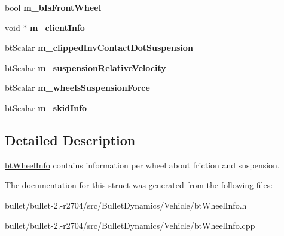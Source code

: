 \begin{DoxyCompactItemize}
\item 
\hypertarget{structbt_wheel_info_a9b3fb7a137ef5b63ccca224934575719}{bool {\bfseries m\+\_\+b\+Is\+Front\+Wheel}}\label{structbt_wheel_info_a9b3fb7a137ef5b63ccca224934575719}

\item 
\hypertarget{structbt_wheel_info_a9f7e8c78591d32cf79cdf9bb82d679d8}{void $\ast$ {\bfseries m\+\_\+client\+Info}}\label{structbt_wheel_info_a9f7e8c78591d32cf79cdf9bb82d679d8}

\item 
\hypertarget{structbt_wheel_info_a160cbd3f2dceb766194638e49f55bf8f}{bt\+Scalar {\bfseries m\+\_\+clipped\+Inv\+Contact\+Dot\+Suspension}}\label{structbt_wheel_info_a160cbd3f2dceb766194638e49f55bf8f}

\item 
\hypertarget{structbt_wheel_info_ab370ba1508dd6c40425fb5b8d4fb4cc4}{bt\+Scalar {\bfseries m\+\_\+suspension\+Relative\+Velocity}}\label{structbt_wheel_info_ab370ba1508dd6c40425fb5b8d4fb4cc4}

\item 
\hypertarget{structbt_wheel_info_a892ec97b81ecc90e4884439aa22815f7}{bt\+Scalar {\bfseries m\+\_\+wheels\+Suspension\+Force}}\label{structbt_wheel_info_a892ec97b81ecc90e4884439aa22815f7}

\item 
\hypertarget{structbt_wheel_info_a2b4991f5aa8d8f07c64c98c2f6e67baf}{bt\+Scalar {\bfseries m\+\_\+skid\+Info}}\label{structbt_wheel_info_a2b4991f5aa8d8f07c64c98c2f6e67baf}

\end{DoxyCompactItemize}


\subsection{Detailed Description}
\hyperlink{structbt_wheel_info}{bt\+Wheel\+Info} contains information per wheel about friction and suspension. 

The documentation for this struct was generated from the following files\+:\begin{DoxyCompactItemize}
\item 
bullet/bullet-\/2.-\/r2704/src/\+Bullet\+Dynamics/\+Vehicle/bt\+Wheel\+Info.\+h\item 
bullet/bullet-\/2.-\/r2704/src/\+Bullet\+Dynamics/\+Vehicle/bt\+Wheel\+Info.\+cpp\end{DoxyCompactItemize}
